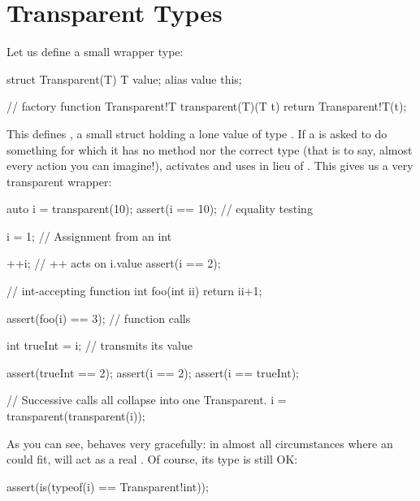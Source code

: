 
\section{Transparent Types}\label{transparenttypes}

Let us define a small wrapper type:

\begin{dcode}
struct Transparent(T)
{
    T value;
    alias value this;
}

// factory function
Transparent!T transparent(T)(T t)
{
    return Transparent!T(t);
}
\end{dcode}

This defines , a small struct holding a lone value of type . If a  is asked to do something for which it has no method nor the correct type (that is to say, almost every action you can imagine!),  activates and uses  in lieu of . This gives us a very transparent wrapper:

\begin{dcode}
auto i = transparent(10);
assert(i == 10); // equality testing

i = 1; // Assignment from an int

++i; // ++ acts on i.value
assert(i == 2); 

// int-accepting function
int foo(int ii) { return ii+1;}

assert(foo(i) == 3); // function calls

int trueInt = i; // transmits its value

assert(trueInt == 2);
assert(i == 2);
assert(i == trueInt);

// Successive calls all collapse into one Transparent.
i = transparent(transparent(i));
\end{dcode}

As you can see,  behaves very gracefully: in almost all circumstances where an  could fit,  will act as a real . Of course, its type is still OK:

\begin{dcode}
assert(is(typeof(i) == Transparent!int));
\end{dcode}

